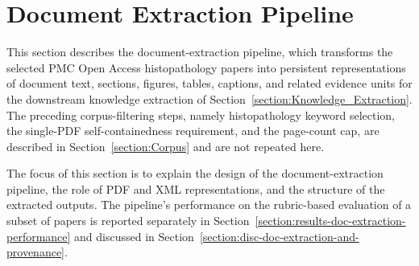 \section{Document Extraction Pipeline}\label{section:Document_Extraction}

\makeatletter
{}
\makeatother

This section describes the document-extraction pipeline, which transforms the selected PMC Open Access histopathology papers into persistent representations of document text, sections, figures, tables, captions, and related evidence units for the downstream knowledge extraction of Section~\ref{section:Knowledge_Extraction}. The preceding corpus-filtering steps, namely histopathology keyword selection, the single-PDF self-containedness requirement, and the page-count cap, are described in Section~\ref{section:Corpus} and are not repeated here.

The focus of this section is to explain the design of the document-extraction pipeline, the role of PDF and XML representations, and the structure of the extracted outputs. The pipeline's performance on the rubric-based evaluation of a subset of papers is reported separately in Section~\ref{section:results-doc-extraction-performance} and discussed in Section~\ref{section:disc-doc-extraction-and-provenance}.










% 